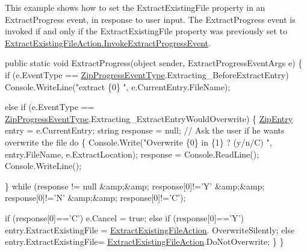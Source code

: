 This example shows how to set the {\ttfamily Extract\+Existing\+File} property in an {\ttfamily Extract\+Progress} event, in response to user input. The {\ttfamily Extract\+Progress} event is invoked if and only if the {\ttfamily Extract\+Existing\+File} property was previously set to {\ttfamily \mbox{\hyperlink{namespace_super_tiled2_unity_1_1_ionic_1_1_zip_a3f8db7242d746d36b45114257b4fe4c0a260afa558b9392c717b397a63c86e1fe}{Extract\+Existing\+File\+Action.\+Invoke\+Extract\+Progress\+Event}}}. 
\begin{DoxyCode}
\textcolor{keyword}{public} \textcolor{keyword}{static} \textcolor{keywordtype}{void} ExtractProgress(\textcolor{keywordtype}{object} sender, ExtractProgressEventArgs e)
\{
    \textcolor{keywordflow}{if} (e.EventType == \mbox{\hyperlink{namespace_super_tiled2_unity_1_1_ionic_1_1_zip_a6584db8196e626ddfc455e74d31a841f}{ZipProgressEventType}}.Extracting\_BeforeExtractEntry)
        Console.WriteLine(\textcolor{stringliteral}{"extract \{0\} "}, e.CurrentEntry.FileName);

    \textcolor{keywordflow}{else} \textcolor{keywordflow}{if} (e.EventType == \mbox{\hyperlink{namespace_super_tiled2_unity_1_1_ionic_1_1_zip_a6584db8196e626ddfc455e74d31a841f}{ZipProgressEventType}}.Extracting\_ExtractEntryWouldOverwrite)
    \{
        \mbox{\hyperlink{class_super_tiled2_unity_1_1_ionic_1_1_zip_1_1_zip_entry_a440b6d4d136b20dc6bdbdd399397e3a0}{ZipEntry}} entry = e.CurrentEntry;
        \textcolor{keywordtype}{string} response = null;
        \textcolor{comment}{// Ask the user if he wants overwrite the file}
        \textcolor{keywordflow}{do}
        \{
            Console.Write(\textcolor{stringliteral}{"Overwrite \{0\} in \{1\} ? (y/n/C) "}, entry.FileName, e.ExtractLocation);
            response = Console.ReadLine();
            Console.WriteLine();

        \} \textcolor{keywordflow}{while} (response != null &amp;&amp; response[0]!=\textcolor{charliteral}{'Y'} &amp;&amp;
                 response[0]!=\textcolor{charliteral}{'N'} &amp;&amp; response[0]!=\textcolor{charliteral}{'C'});

        \textcolor{keywordflow}{if}  (response[0]==\textcolor{charliteral}{'C'})
            e.Cancel = \textcolor{keyword}{true};
        \textcolor{keywordflow}{else} \textcolor{keywordflow}{if} (response[0]==\textcolor{charliteral}{'Y'})
            entry.ExtractExistingFile = \mbox{\hyperlink{namespace_super_tiled2_unity_1_1_ionic_1_1_zip_a3f8db7242d746d36b45114257b4fe4c0}{ExtractExistingFileAction}}.
      OverwriteSilently;
        \textcolor{keywordflow}{else}
            entry.ExtractExistingFile= \mbox{\hyperlink{namespace_super_tiled2_unity_1_1_ionic_1_1_zip_a3f8db7242d746d36b45114257b4fe4c0}{ExtractExistingFileAction}}.DoNotOverwrite;
    \}
\}
\end{DoxyCode}
